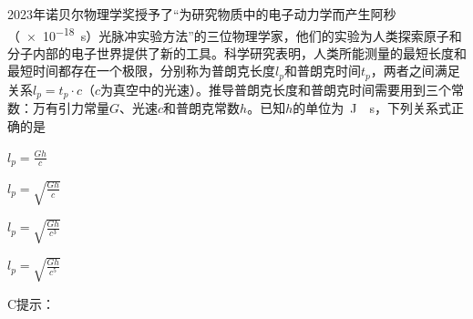 2023年诺贝尔物理学奖授予了“为研究物质中的电子动力学而产生阿秒（\qty{e-18}{s}）光脉冲实验方法”的三位物理学家，他们的实验为人类探索原子和分子内部的电子世界提供了新的工具。科学研究表明，人类所能测量的最短长度和最短时间都存在一个极限，分别称为普朗克长度\(l_p\)和普朗克时间\(t_p\)，两者之间满足关系\(l_p = t_p\cdot c\)（\(c\)为真空中的光速）。推导普朗克长度和普朗克时间需要用到三个常数：万有引力常量\(G\)、光速\(c\)和普朗克常数\(h\)。已知\(h\)的单位为\qty{}{J\cdot s}，下列关系式正确的是\paren[]
\begin{choices}
    \item \(l_p = \frac{Gh}{c}\)
    \item \(l_p = \sqrt{\frac{Gh}{c}}\)
    \item \(l_p = \sqrt{\frac{Gh}{c^3}}\)
    \item \(l_p = \sqrt{\frac{Gh}{c^5}}\)
\end{choices}
\begin{answer}
    C\qquad 提示：
\end{answer}